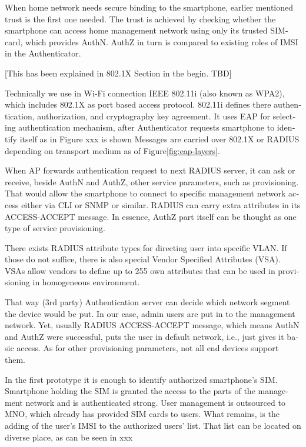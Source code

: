 \documentclass[12pt,a4paper,english]{tutthesis}
\begin{document}
\begin{otherlanguage}{english}
When home network needs secure binding to the smartphone, earlier
mentioned trust is the first one needed.  The trust is achieved by
checking whether the smartphone can access home management
network using only its trusted SIM-card, which provides AuthN. AuthZ in
turn is compared to existing roles of IMSI in the Authenticator.


[This has been explained in 802.1X Section in the begin. TBD]

Technically we use in Wi-Fi connection IEEE 802.11i (also known as WPA2), which includes
802.1X as port based access protocol.  802.11i defines there
authentication, authorization, and cryptography key agreement.
 It uses EAP for selecting authentication 
mechanism, after Authenticator requests smartphone to identify itself as in Figure xxx is shown
Messages are carried over 802.1X or RADIUS depending on transport
medium as of Figure\ref{fig:eap-layers}.


When AP forwards authentication request to next RADIUS server, it can
ask or receive, beside AuthN and AuthZ, other service parameters, such
as provisioning. That would allow the smartphone to connect to
specific management network access either via CLI or SNMP or
 similar\cite[p.4]{rfc5608}.  RADIUS can carry extra attributes in its
ACCESS-ACCEPT message.   In essence, AuthZ part itself can be thought as
one type of service provisioning. 


There exists RADIUS attribute types for directing user into specific
VLAN. If those do not suffice, there is also special Vendor Specified
Attributes (VSA). VSAs allow vendors to define up to 255 own
attributes that can be used in provisioning in homogeneous environment. 


That way (3rd party) Authentication server can decide which network
segment the device would be put.  In our case, admin users are put in
to the management network.  Yet, usually RADIUS ACCESS-ACCEPT message,
which means AuthN and AuthZ were successful,  puts the user in
default network, i.e., just gives it basic access. As for other
provisioning parameters, not all end devices support them.

In the first prototype it is enough to identify authorized
smartphone's SIM.  Smartphone holding the SIM is granted the access to
the parts of the management network and is authenticated strong.  User
management is outsourced to MNO, which
already has provided SIM cards to users. What remains, is the adding
of the user's IMSI to the authorized users' list. That list can be
located on diverse place, as can be seen in xxx



\end{otherlanguage}
\end{document}
